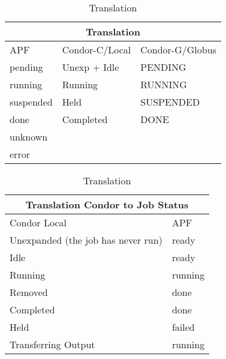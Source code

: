 \documentclass[a4paper]{jpconf}
\begin{document}
\begin{table}
\begin{tabular}{|l|l|l|}
\hline
\multicolumn{3}{|c|}{Translation} \\
\hline
\hline
APF         &      Condor-C/Local      &        Condor-G/Globus \\ \hline 
\hline
\hline
pending     &      Unexp + Idle        &        PENDING         \\ \hline 
running     &      Running             &        RUNNING         \\ \hline 
suspended   &      Held                &        SUSPENDED       \\ \hline 
done        &      Completed           &        DONE            \\ \hline
unknown     &                          &                        \\ \hline    
error       &                          &                        \\ \hline
\end{tabular}\caption{Translation}
\label{translation}
\end{table}



\begin{table}
\begin{tabular}{|l|l|}
\hline
\multicolumn{2}{|c|}{Translation Condor to Job Status} \\
\hline
\hline
Condor Local   & APF       \\
\hline
\hline
Unexpanded (the job has never run)    &   ready      \\ \hline
Idle                                  &   ready      \\ \hline
Running                               &   running    \\ \hline
Removed                               &   done       \\ \hline
Completed                             &   done       \\ \hline
Held                                  &   failed     \\ \hline
Transferring Output                   &   running    \\ \hline
\end{tabular}\caption{Translation}
\label{translation}
\end{table}
\end{document}
